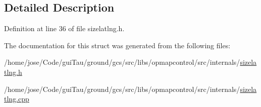 \subsection{Detailed Description}


Definition at line 36 of file sizelatlng.\-h.



The documentation for this struct was generated from the following files\-:\begin{DoxyCompactItemize}
\item 
/home/jose/\-Code/gui\-Tau/ground/gcs/src/libs/opmapcontrol/src/internals/\hyperlink{sizelatlng_8h}{sizelatlng.\-h}\item 
/home/jose/\-Code/gui\-Tau/ground/gcs/src/libs/opmapcontrol/src/internals/\hyperlink{sizelatlng_8cpp}{sizelatlng.\-cpp}\end{DoxyCompactItemize}
